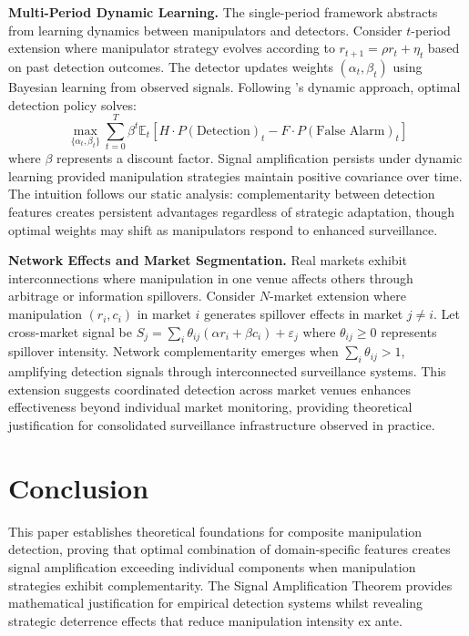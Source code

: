 \documentclass[12pt]{article}
\newcommand{\E}{\mathbb{E}}
\begin{document}
\textbf{Multi-Period Dynamic Learning.} The single-period framework abstracts from learning dynamics between manipulators and detectors. Consider $t$-period extension where manipulator strategy evolves according to $r_{t+1} = \rho r_t + \eta_t$ based on past detection outcomes. The detector updates weights $(\alpha_t, \beta_t)$ using Bayesian learning from observed signals. Following \citet{bo2023optimal}'s dynamic approach, optimal detection policy solves:
\begin{equation}
\max_{\{\alpha_t, \beta_t\}} \sum_{t=0}^T \beta^t \E_t[H \cdot P(\text{Detection})_t - F \cdot P(\text{False Alarm})_t]
\end{equation}
where $\beta$ represents a discount factor. Signal amplification persists under dynamic learning provided manipulation strategies maintain positive covariance over time. The intuition follows our static analysis: complementarity between detection features creates persistent advantages regardless of strategic adaptation, though optimal weights may shift as manipulators respond to enhanced surveillance.

\textbf{Network Effects and Market Segmentation.} Real markets exhibit interconnections where manipulation in one venue affects others through arbitrage or information spillovers. Consider $N$-market extension where manipulation $(r_i, c_i)$ in market $i$ generates spillover effects in market $j \neq i$. Let cross-market signal be $S_j = \sum_{i} \theta_{ij}(\alpha r_i + \beta c_i) + \varepsilon_j$ where $\theta_{ij} \geq 0$ represents spillover intensity. Network complementarity emerges when $\sum_i \theta_{ij} > 1$, amplifying detection signals through interconnected surveillance systems. This extension suggests coordinated detection across market venues enhances effectiveness beyond individual market monitoring, providing theoretical justification for consolidated surveillance infrastructure observed in practice.

\section{Conclusion}

This paper establishes theoretical foundations for composite manipulation detection, proving that optimal combination of domain-specific features creates signal amplification exceeding individual components when manipulation strategies exhibit complementarity. The Signal Amplification Theorem provides mathematical justification for empirical detection systems whilst revealing strategic deterrence effects that reduce manipulation intensity ex ante.
\end{document}
